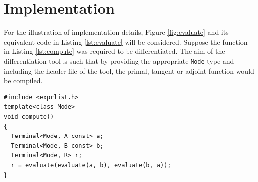 \documentclass[a4paper,10pt]{article}
\begin{document}
\section{Implementation}
For the illustration of implementation details, Figure \ref{fig:evaluate} and its equivalent code in Listing \ref{lst:evaluate} will be considered. Suppose the function in Listing \ref{lst:compute} was required to be differentiated. The aim of the differentiation tool is such that by providing the appropriate \texttt{Mode} type and including the header file of the tool, the primal, tangent or adjoint function would be compiled.\newline
\begin{lstlisting}[caption={Nested function calls must propagate their expression trees.}, label=lst:compute]
#include <exprlist.h>
template<class Mode>
void compute()
{
  Terminal<Mode, A const> a;
  Terminal<Mode, B const> b;
  Terminal<Mode, R> r;
  r = evaluate(evaluate(a, b), evaluate(b, a));
}
\end{lstlisting}
\end{document}
